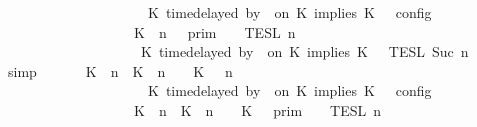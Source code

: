 \begin{isabellebody}
\ \ \ \ \ \ \ \ \ \ \ \ \ \ \ \ \ \ {\isasymturnstile}\ {\isasymPsi}\ {\isasymtriangleright}\ {\isacharparenleft}{\isacharparenleft}K\ time{\isacharminus}delayed\ by\ {\isasymdelta}{\isasymtau}\ on\ K\ implies\ K\ {\isacharhash}\ {\isasymPhi}{\isacharparenright}\ {\isasymrbrakk}\isactrlsub c\isactrlsub o\isactrlsub n\isactrlsub f\isactrlsub i\isactrlsub g\isanewline
\ \ \ \ \ \ \ \ \ \ \ \ \ \ \ \ \ {\isacharequal}\ {\isasymlbrakk}{\isasymlbrakk}\ {\isacharparenleft}K\ {\isasymnot}{\isasymUp}\ n{\isacharparenright}\ {\isacharhash}\ {\isasymGamma}\ {\isasymrbrakk}{\isasymrbrakk}\isactrlsub p\isactrlsub r\isactrlsub i\isactrlsub m\ {\isasyminter}\ {\isasymlbrakk}{\isasymlbrakk}\ {\isasymPsi}\ {\isasymrbrakk}{\isasymrbrakk}\isactrlsub T\isactrlsub E\isactrlsub S\isactrlsub L\isactrlbsup {\isasymge}\ n\isactrlesup \isanewline
\ \ \ \ \ \ \ \ \ \ \ \ \ \ \ \ \ \ {\isasyminter}\ {\isasymlbrakk}{\isasymlbrakk}\ {\isacharparenleft}K\ time{\isacharminus}delayed\ by\ {\isasymdelta}{\isasymtau}\ on\ K\ implies\ K\ {\isacharhash}\ {\isasymPhi}\ {\isasymrbrakk}{\isasymrbrakk}\isactrlsub T\isactrlsub E\isactrlsub S\isactrlsub L\isactrlbsup {\isasymge}\ Suc\ n\isactrlesup {\isacartoucheclose}\isanewline
\ \ \ \ \isamarkupfalse%
\ simp\isanewline
\ \ \isamarkupfalse%
\ \isamarkupfalse%
\ {\isacartoucheopen}{\isasymlbrakk}\ {\isacharparenleft}{\isacharparenleft}K\ {\isasymUp}\ n{\isacharparenright}\ {\isacharhash}\ {\isacharparenleft}K\ {\isacharat}\ n\ {\isasymoplus}\ {\isasymdelta}{\isasymtau}\ {\isasymRightarrow}\ K\ {\isacharhash}\ {\isasymGamma}{\isacharparenright}{\isacharcomma}\ n\isanewline
\ \ \ \ \ \ \ \ \ \ \ \ \ \ \ \ \ \ {\isasymturnstile}\ {\isasymPsi}\ {\isasymtriangleright}\ {\isacharparenleft}{\isacharparenleft}K\ time{\isacharminus}delayed\ by\ {\isasymdelta}{\isasymtau}\ on\ K\ implies\ K\ {\isacharhash}\ {\isasymPhi}{\isacharparenright}\ {\isasymrbrakk}\isactrlsub c\isactrlsub o\isactrlsub n\isactrlsub f\isactrlsub i\isactrlsub g\isanewline
\ \ \ \ \ \ \ \ \ \ \ \ \ \ \ \ \ {\isacharequal}\ {\isasymlbrakk}{\isasymlbrakk}\ {\isacharparenleft}K\ {\isasymUp}\ n{\isacharparenright}\ {\isacharhash}\ {\isacharparenleft}K\ {\isacharat}\ n\ {\isasymoplus}\ {\isasymdelta}{\isasymtau}\ {\isasymRightarrow}\ K\ {\isacharhash}\ {\isasymGamma}\ {\isasymrbrakk}{\isasymrbrakk}\isactrlsub p\isactrlsub r\isactrlsub i\isactrlsub m\ {\isasyminter}\ {\isasymlbrakk}{\isasymlbrakk}\ {\isasymPsi}\ {\isasymrbrakk}{\isasymrbrakk}\isactrlsub T\isactrlsub E\isactrlsub S\isactrlsub L\isactrlbsup {\isasymge}\ n\isactrlesup \isanewline

\end{isabellebody}
